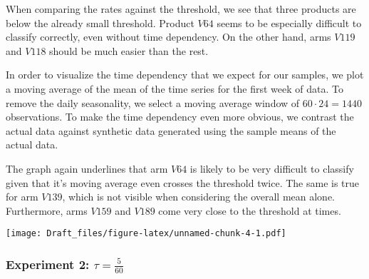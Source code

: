 \documentclass[12pt,]{article}
\begin{document}
When comparing the rates against the threshold, we see that three
products are below the already small threshold. Product \(V64\) seems to
be especially difficult to classify correctly, even without time
dependency. On the other hand, arms \(V119\) and \(V118\) should be much
easier than the rest.

In order to visualize the time dependency that we expect for our
samples, we plot a moving average of the mean of the time series for the
first week of data. To remove the daily seasonality, we select a moving
average window of \(60\cdot24 = 1440\) observations. To make the time
dependency even more obvious, we contrast the actual data against
synthetic data generated using the sample means of the actual data.

The graph again underlines that arm \(V64\) is likely to be very
difficult to classify given that it's moving average even crosses the
threshold twice. The same is true for arm \(V139\), which is not visible
when considering the overall mean alone. Furthermore, arms \(V159\) and
\(V189\) come very close to the threshold at times.

\texttt{[image: Draft\_files/figure-latex/unnamed-chunk-4-1.pdf]}

\subsubsection{\texorpdfstring{Experiment 2:
\(\tau = \frac{5}{60}\)}{Experiment 2: \textbackslash{}tau = \textbackslash{}frac\{5\}\{60\}}}\label{experiment-2-tau-frac560}
\end{document}
